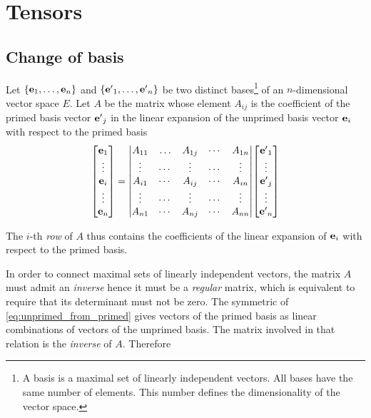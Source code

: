 \appendix
\chapter{Tensors}
\label{ch:Tensors} 

\section{Change of basis}
Let $\{\vb{e}_1, \ldots, \vb{e}_n \}$ and $\{{\vb{e}'}_1, \ldots, {\vb{e}'}_n \}$ be two distinct bases\footnote{A basis is a maximal set of linearly independent vectors. All bases have the same number of elements. This number defines the dimensionality of the vector space.} of an $n$-dimensional vector space $E$.  
Let $A$ be the matrix whose element $A_{ij}$ is the coefficient of the primed basis vector ${\vb{e}'}_j$ in the linear expansion of the unprimed basis vector $\vb{e}_i$ with respect to the primed basis    
\begin{align}
\label{eq:unprimed_from_primed}
\mqty[ \vb{e}_1 \\ \vdots \\ \vb{e}_i \\ \vdots \\ \vb{e}_n ] = \mqty|
A_{11}  &  \ldots  & A_{1j}  &  \cdots  & A_{1n} \\
\vdots  &  \cdots  & \vdots  &  \cdots  & \vdots \\
A_{i1}  &  \cdots  & A_{ij}  &  \cdots  & A_{in} \\
\vdots  &  \cdots  & \vdots  &  \cdots  & \vdots \\
A_{n1}  &  \cdots  & A_{nj}  &  \cdots  & A_{nn} |
\mqty[ {\vb{e}'}_1 \\ \vdots \\ {\vb{e}'}_j \\ \vdots \\ {\vb{e}'}_n ]  
\end{align}

The $i$-th \textit{row} of $A$ thus contains the coefficients of the linear expansion of $\vb{e}_i$ with respect to the primed basis. 

In order to connect maximal sets of linearly independent vectors, the matrix $A$ must admit an \textit{inverse} hence it must be a \textit{regular} matrix, which is equivalent to require that its determinant must not be zero. The symmetric of \ref{eq:unprimed_from_primed} gives vectors of the primed basis as linear combinations of vectors of the unprimed basis. The matrix involved in that relation is the \textit{inverse} of $A$. Therefore

